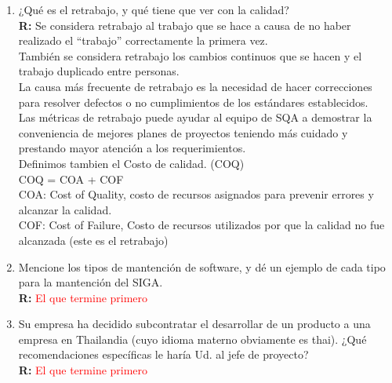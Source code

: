 \begin{enumerate}
	\item ¿Qué es el retrabajo, y qué tiene que ver con la calidad?\\
	\textbf{R:}
	Se considera retrabajo al trabajo que se hace a causa de no haber realizado el “trabajo”  correctamente la primera vez.\\
	También se considera retrabajo los cambios continuos que se hacen y el trabajo duplicado entre personas.\\
	La causa más frecuente de retrabajo es la necesidad de hacer correcciones para resolver defectos o no cumplimientos de los estándares establecidos.\\
	Las  métricas de retrabajo puede ayudar al equipo de SQA a demostrar la conveniencia de mejores planes de proyectos teniendo más cuidado y prestando mayor atención a los requerimientos.\\
	Definimos tambien el Costo de calidad. (COQ)\\
	COQ =  COA + COF\\
	COA: Cost of Quality, costo de recursos asignados para prevenir errores y alcanzar la calidad.\\
	COF: Cost of Failure, Costo de recursos utilizados por que la calidad no fue alcanzada (este es el retrabajo)\\

	\item Mencione los tipos de mantención de software, y dé un ejemplo de cada tipo para la mantención del SIGA.\\
	\textbf{R:}
	\textcolor{red}{El que termine primero}

	\item Su empresa ha decidido subcontratar el desarrollar de un producto a una empresa en Thailandia (cuyo idioma materno obviamente es thai). ¿Qué recomendaciones específicas le haría Ud. al jefe de proyecto?\\
	\textbf{R:}
	\textcolor{red}{El que termine primero}

\end{enumerate}
